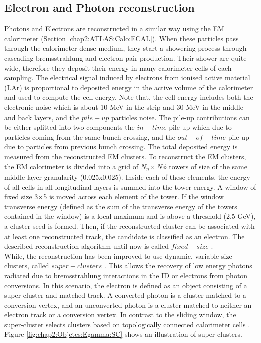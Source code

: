 \subsection{Electron and Photon reconstruction}
\label{chap2:Objects:Egamma}
Photons and Electrons are reconstructed in a similar way using the EM calorimeter (Section \ref{chap2:ATLAS:Calo:ECAL}). When these particles pass through the calorimeter dense medium, they start a showering process through cascading bremsstrahlung and electron pair production. Their shower are quite wide, therefore they deposit their energy in many calorimeter cells of each sampling. The electrical signal induced by electrons from ionised active material (LAr) is proportional to deposited energy in the active volume of the calorimeter and used to compute the cell energy. Note that, the cell energy includes both the electronic noise which is about 10 MeV in the strip and 30 MeV in the middle and back layers, and the $pile-up$ particles noise. The pile-up contributions can be either splitted into two components the $in-time$ pile-up which due to particles coming from the same bunch crossing, and the $out-of-time$ pile-up due to particles from previous bunch crossing. The total deposited energy is measured from the reconstructed EM clusters. To reconstruct the EM clusters, the EM calorimeter is divided into a grid of $N_\eta\times N\phi$ towers of size of the same middle layer granularity (0.025x0.025). Inside each of these elements, the energy of all cells in all longitudinal layers is summed into the tower energy. A window of fixed size 3×5 is moved across each element of the tower. If the window transverse energy \eT (defined as the sum of the transverse energy of the towers contained in the window) is a local maximum and is above a threshold (2.5 GeV), a cluster seed is formed. Then, if the reconstructed cluster can be associated with at least one reconstructed track, the candidate is classified as an electron. The described reconstruction algorithm until now is called $fixed-size$ \cite{Fixed_size_cluster}. \\
While, the reconstruction has been improved to use dynamic, variable-size clusters, called $super-clusters$ \cite{Egamma_Perf_run2}. This allows the recovery of low energy photons radiated due to bremsstrahlung interactions in the ID or electrons from photon conversions. In this scenario, the electron is defined as an object consisting of a super cluster and matched track. A converted photon is a cluster matched to a conversion vertex, and an unconverted photon is a cluster matched to neither an electron track or a conversion vertex. In contrast to the sliding window, the super-cluster selects clusters based on topologically connected calorimeter cells \cite{Topo_cluster}. Figure \ref{fig:chap2:Objetcs:Egamma:SC} shows an illustration of super-clusters. 
